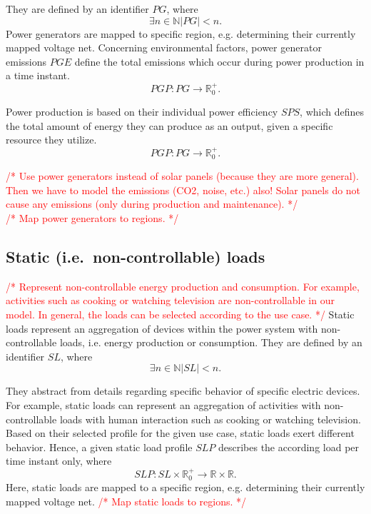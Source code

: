 \documentclass[conference]{IEEEtran}
\newcommand{\todo}[1]{\textcolor{red}{/* #1 */}}
\begin{document}
	They are defined by an identifier $PG$, where 
	\[
	\exists n \in \mathbb{N} |PG| < n \mathrm{.}
	\]
	Power generators are mapped to specific region, e.g. determining their currently mapped voltage net.
	Concerning environmental factors, power generator emissions $PGE$ define the total emissions which occur during power production in a time instant.
	\[
	PGP : PG \rightarrow \mathbb{R}_0^+ \mathrm{.}
	\]
	
	Power production is based on their individual power efficiency $SPS$, which defines the total amount of energy they can produce as an output, given a specific resource they utilize.
	\[	
	PGP : PG \rightarrow \mathbb{R}_0^+ \mathrm{.}
	\]
%	
%	
	
	\todo{Use power generators instead of solar panels (because they are more general). Then we have to model the emissions (CO2, noise, etc.) also! Solar panels do not cause any emissions (only during production and maintenance).}
	\\
	\todo{Map power generators to regions.}
	
	\subsection{Static (i.e.\ non-controllable) loads}
	\label{static_loads}
	\todo{Represent non-controllable energy production and consumption. For example, activities such as cooking or watching television are non-controllable in our model. In general, the loads can be selected according to the use case.}
	Static loads represent an aggregation of devices within the power system with non-controllable loads, i.e. energy production or consumption. 
	They are defined by an identifier $SL$, where 
	\[
	\exists n \in \mathbb{N} |SL| < n \mathrm{.}
	\]
		
	They abstract from details regarding specific behavior of specific electric devices.
	For example, static loads can represent an aggregation of activities with non-controllable loads with human interaction such as cooking or watching television. Based on their selected profile for the given use case, static loads exert different behavior.
	Hence, a given static load profile $SLP$ describes the according load per time instant only, where
	\[
	SLP : SL \times \mathbb{R}_0^+ \rightarrow \mathbb{R} \times \mathbb{R} \mathrm{.}
	\]
	Here, static loads are mapped to a specific region, e.g. determining their currently mapped voltage net.
	\todo{Map static loads to regions.}
	
\end{document}
